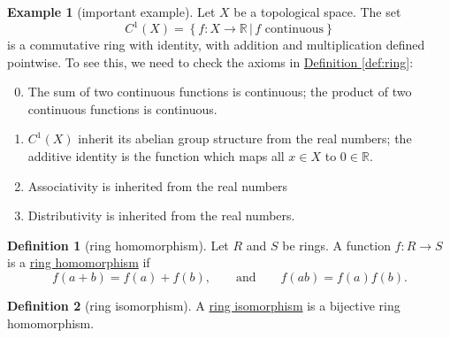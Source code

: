 \documentclass[a4paper,10pt]{scrreprt}
\newcommand{\R}{\mathbb{R}}
\newcommand{\defn}[1]{\ul{#1}}
\theoremstyle{definition}
\newtheorem{definition}{Definition}[section]
\newtheorem{example}{Example}[section]
\theoremstyle{plain}
\theoremstyle{remark}
\begin{document}
\begin{example}[important example]
  Let $X$ be a topological space. The set
  \begin{equation*}
    C^{1}(X) = \left\{ f\colon X \to \R\,\big|\, f \text{ continuous} \right\}
  \end{equation*}
  is a commutative ring with identity, with addition and multiplication defined pointwise. To see this, we need to check the axioms in \hyperref[def:ring]{Definition \ref*{def:ring}}:
  \begin{enumerate}
      \setcounter{enumi}{-1}
    \item The sum of two continuous functions is continuous; the product of two continuous functions is continuous.
    \item $C^{1}(X)$ inherit its abelian group structure from the real numbers; the additive identity is the function which maps all $x \in X$ to $0 \in \R$.
    \item Associativity is inherited from the real numbers
    \item Distributivity is inherited from the real numbers.
  \end{enumerate}
\end{example}

\begin{definition}[ring homomorphism]
  \label{def:ringhomomorphism}
  Let $R$ and $S$ be rings. A function $f\colon R \to S$ is a \defn{ring homomorphism} if
  \begin{equation*}
    f(a+b) = f(a) + f(b), \qquad \text{and}\qquad f(ab) = f(a)f(b).
  \end{equation*}
\end{definition}

\begin{definition}[ring isomorphism]
  \label{def:ringisomorphism} 
  A \defn{ring isomorphism} is a bijective ring homomorphism.
\end{definition}
\end{document}
